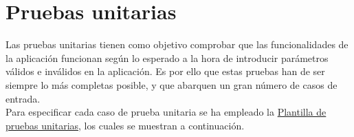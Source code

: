 \section{Pruebas unitarias}

Las pruebas unitarias \cite{pruebaunitaria} tienen como objetivo comprobar que las funcionalidades de la aplicación funcionan según lo esperado a la hora de introducir parámetros válidos e inválidos en la aplicación. Es por ello que estas pruebas han de ser siempre lo más completas posible, y que abarquen un gran número de casos de entrada. 
\\

Para especificar cada caso de prueba unitaria se ha empleado la \hyperref[enlacePUX]{Plantilla de pruebas unitarias}, los cuales se muestran a continuación.
